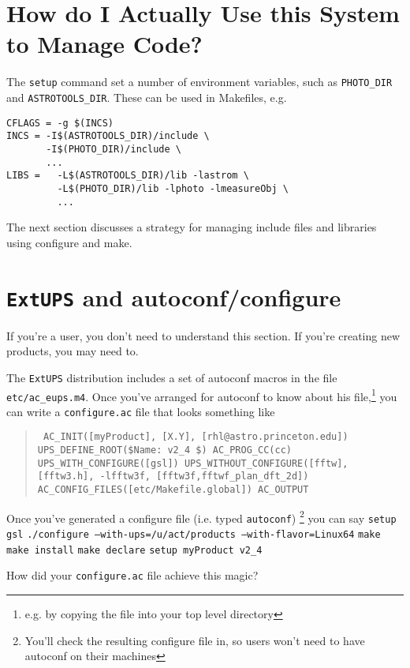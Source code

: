 \documentclass{article}
\newcommand{\code}[1]{\texttt{#1}}
\newcommand{\eups}{\code{ExtUPS}}
\begin{document}
\section{How do I Actually Use this System to Manage Code?}

The \code{setup} command set a number of environment variables,
such as \code{PHOTO\_DIR} and \code{ASTROTOOLS\_DIR}. These can
be used in Makefiles, e.g.
\begin{verbatim}
CFLAGS = -g $(INCS)
INCS = -I$(ASTROTOOLS_DIR)/include \
       -I$(PHOTO_DIR)/include \
       ...
LIBS =   -L$(ASTROTOOLS_DIR)/lib -lastrom \
         -L$(PHOTO_DIR)/lib -lphoto -lmeasureObj \
         ...
\end{verbatim}

The next section discusses a strategy for managing include files
and libraries using configure and make.

\section{\eups{} and autoconf/configure}

If you're a user, you don't need to understand this section. If
you're creating new products, you may need to.

The \eups{} distribution includes a set of autoconf macros
in the file \texttt{etc/ac\_eups.m4}. Once you've arranged for
autoconf to know about his file,\footnote{e.g. by copying the
  file into your top level directory} you can write a
\texttt{configure.ac} file that looks something like
\begin{quote}
\obeylines\tt\small\parskip=0pt
AC\_INIT([myProduct], [X.Y], [rhl@astro.princeton.edu])
UPS\_DEFINE\_ROOT(\${Name}: v2\_4 \$)
AC\_PROG\_CC(cc)
UPS\_WITH\_CONFIGURE([gsl])
UPS\_WITHOUT\_CONFIGURE([fftw], [fftw3.h], -lfftw3f, [fftw3f,fftwf\_plan\_dft\_2d])
AC\_CONFIG\_FILES([etc/Makefile.global])
AC\_OUTPUT
\end{quote}

Once you've generated a configure file (i.e. typed \texttt{autoconf})%
\footnote{You'll check the resulting configure file in, so users won't
  need to have autoconf on their machines}
you can say\hfil\break
\texttt{setup gsl}\hfil\break
\texttt{./configure --with-ups=/u/act/products --with-flavor=Linux64}\hfil\break
\texttt{make}\hfil\break
\texttt{make install}\hfil\break
\texttt{make declare}\hfil\break
\texttt{setup myProduct v2\_4}\hfil\break

How did your \texttt{configure.ac} file achieve this magic?
\end{document}
